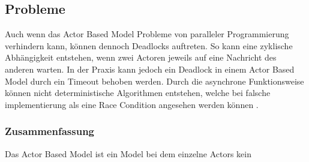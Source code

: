 \subsection{Probleme}
Auch wenn das Actor Based Model Probleme von paralleler Programmierung verhindern kann, können dennoch Deadlocks auftreten. So kann eine zyklische Abhängigkeit entstehen, wenn zwei Actoren jeweils auf eine Nachricht des anderen warten. In der Praxis kann jedoch ein Deadlock in einem Actor Based Model durch ein Timeout behoben werden. Durch die asynchrone Funktionsweise können nicht deterministische Algorithmen entstehen, welche bei falsche implementierung als eine Race Condition angesehen werden können \cite[]{Erb2012}. 


\subsubsection{Zusammenfassung}
Das Actor Based Model ist ein Model bei dem einzelne Actors kein
